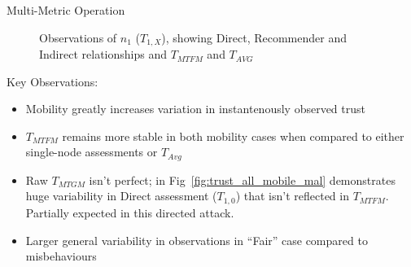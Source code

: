 \documentclass{beamer}
\begin{document}
\begin{frame}[allowframebreaks]{Multi-Metric Operation}
  \setcounter{subfigure}{0}%
  \begin{figure}[htp]
    \centering
    \hfil
    \hfil
    \hfil

    \hfil
    \hfil
    \hfil
    \caption{Observations of $n_1$ ($T_{1,X}$), showing Direct, Recommender and Indirect relationships and $T_{MTFM}$ and $T_{AVG}$\hyperlink{fig:trust_mobility_closeup}{}}
    \label{fig:trust_mobility}
  \end{figure}
\framebreak
Key Observations: 
  \begin{itemize}
    \item Mobility greatly increases variation in instantenously observed trust
    \item $T_{MTFM}$ remains more stable in both mobility cases when compared to either single-node assessments or $T_{Avg}$
    \item Raw $T_{MTGM}$ isn't perfect; in Fig~\ref{fig:trust_all_mobile_mal} demonstrates huge variability in Direct assessment ($T_{1,0}$) that isn't reflected in $T_{MTFM}$. Partially expected in this directed attack.
    \item Larger general variability in observations in ``Fair'' case compared to misbehaviours
  \end{itemize}
\end{frame}
\end{document}
